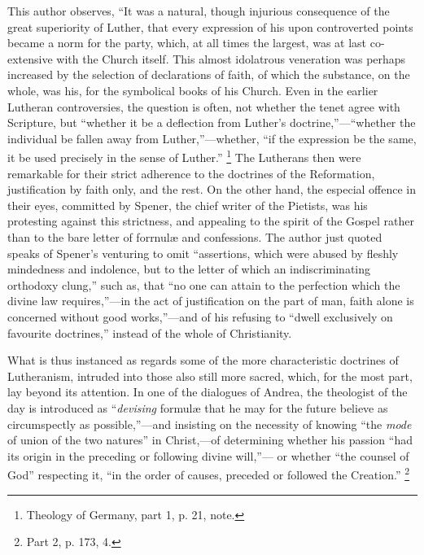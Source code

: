 This author observes, ``It was a natural, though
injurious consequence of the great superiority of Luther, that every
expression of his upon controverted points became a norm for the party,
which, at all times the largest, was at last co-extensive with the
Church itself. This almost idolatrous veneration was perhaps increased
by the selection of declarations of faith, of which the substance, on
the whole, was his, for the symbolical books of his Church. Even in the
earlier Lutheran controversies, the question is often, not whether the
tenet agree with Scripture, but ``whether it be a deflection from Luther's
doctrine,''—``whether the individual be fallen away from Luther,''—whether,
``if the expression be the same, it be used precisely in the sense of
Luther.'' \footnote{Theology of Germany, part 1, p. 21, note.} The Lutherans then
were remarkable for their strict adherence to the doctrines of the
Reformation, justification by faith only, and the rest. On the
other hand, the especial offence in their eyes, committed by Spener, the
chief writer of the Pietists, was his protesting against this
strictness, and appealing to the spirit of the Gospel rather than to the
bare letter of forrnulæ and confessions. The author just quoted speaks
of Spener's venturing to omit ``assertions, which were abused by fleshly
mindedness and indolence, but to the letter of which an indiscriminating
orthodoxy clung,'' such as, that ``no one can attain to the perfection
which the divine law requires,''—in the act of justification on the
part of man, faith alone is concerned without good works,''—and of his
refusing to ``dwell exclusively on favourite doctrines,'' instead of the
whole of Christianity.

What is thus instanced as regards some of the more
characteristic doctrines of Lutheranism, intruded into those also still
more sacred, which, for the most part, lay beyond its attention. In one
of the dialogues of Andrea, the theologist of the day is introduced as ``\emph{devising}
formulæ that he may for the future believe as circumspectly as
possible,''—and insisting on the necessity of knowing ``the \emph{mode}
of union of the two natures'' in Christ,—of determining whether his
passion ``had its origin in the preceding or following divine will,''—
or whether ``the counsel of God'' respecting it, ``in the order of causes,
preceded or followed the Creation.'' \footnote{Part 2, p. 173, 4.}

